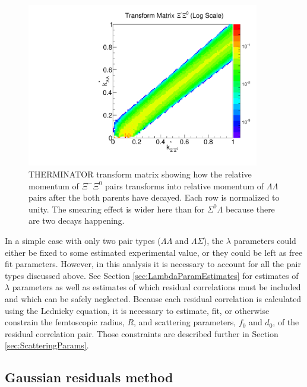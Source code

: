 \begin{figure}[hbtp]
\begin{center}
\includegraphics[width=24pc]{Figures/TransformMatrices/2016-7-20-TransformMatrixXiCXi0NormLog.pdf}
\end{center}
\caption[Transform matrix for $k^*_{\Xi^-\Xi^0} \rightarrow k^*_{\Lambda\Lambda}$]{THERMINATOR \cite{Chojnacki:2011hb} transform matrix showing how the relative momentum of $\Xi^-\Xi^0$ pairs transforms into relative momentum of $\Lambda\Lambda$ pairs after the both parents have decayed. Each row is normalized to unity. The smearing effect is wider here than for $\Sigma^0\Lambda$ because there are two decays happening.}
\label{fig:TherminatorXcX0}
\end{figure}

In a simple case with only two pair types ($\Lambda\Lambda$ and $\Lambda\Sigma$), the $\lambda$ parameters could either be fixed to some estimated experimental value, or they could be left as free fit parameters.
However, in this analysis it is necessary to account for all the pair types discussed above.
See Section \ref{sec:LambdaParamEstimates} for estimates of $\lambda$ parameters as well as estimates of which residual correlations must be included and which can be safely neglected.  
Because each residual correlation is calculated using the Lednicky equation, it is necessary to estimate, fit, or otherwise constrain the femtoscopic radius, $R$, and scattering parameters, $f_0$ and $d_0$, of the residual correlation pair.
Those constraints are described further in Section \ref{sec:ScatteringParams}.

\subsection{Gaussian residuals method}
\label{sec:GaussianResiduals}

